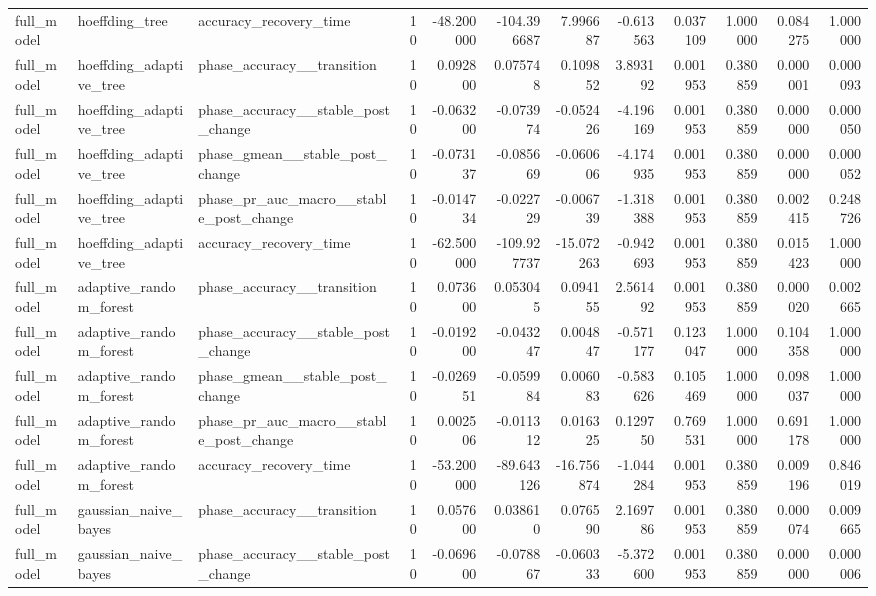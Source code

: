 \begin{tabular}{lllrrrrrrrrr}
full\_model & hoeffding\_tree & accuracy\_recovery\_time & 10 & -48.200000 & -104.396687 & 7.996687 & -0.613563 & 0.037109 & 1.000000 & 0.084275 & 1.000000 \\
full\_model & hoeffding\_adaptive\_tree & phase\_accuracy\_\_transition & 10 & 0.092800 & 0.075748 & 0.109852 & 3.893192 & 0.001953 & 0.380859 & 0.000001 & 0.000093 \\
full\_model & hoeffding\_adaptive\_tree & phase\_accuracy\_\_stable\_post\_change & 10 & -0.063200 & -0.073974 & -0.052426 & -4.196169 & 0.001953 & 0.380859 & 0.000000 & 0.000050 \\
full\_model & hoeffding\_adaptive\_tree & phase\_gmean\_\_stable\_post\_change & 10 & -0.073137 & -0.085669 & -0.060606 & -4.174935 & 0.001953 & 0.380859 & 0.000000 & 0.000052 \\
full\_model & hoeffding\_adaptive\_tree & phase\_pr\_auc\_macro\_\_stable\_post\_change & 10 & -0.014734 & -0.022729 & -0.006739 & -1.318388 & 0.001953 & 0.380859 & 0.002415 & 0.248726 \\
full\_model & hoeffding\_adaptive\_tree & accuracy\_recovery\_time & 10 & -62.500000 & -109.927737 & -15.072263 & -0.942693 & 0.001953 & 0.380859 & 0.015423 & 1.000000 \\
full\_model & adaptive\_random\_forest & phase\_accuracy\_\_transition & 10 & 0.073600 & 0.053045 & 0.094155 & 2.561492 & 0.001953 & 0.380859 & 0.000020 & 0.002665 \\
full\_model & adaptive\_random\_forest & phase\_accuracy\_\_stable\_post\_change & 10 & -0.019200 & -0.043247 & 0.004847 & -0.571177 & 0.123047 & 1.000000 & 0.104358 & 1.000000 \\
full\_model & adaptive\_random\_forest & phase\_gmean\_\_stable\_post\_change & 10 & -0.026951 & -0.059984 & 0.006083 & -0.583626 & 0.105469 & 1.000000 & 0.098037 & 1.000000 \\
full\_model & adaptive\_random\_forest & phase\_pr\_auc\_macro\_\_stable\_post\_change & 10 & 0.002506 & -0.011312 & 0.016325 & 0.129750 & 0.769531 & 1.000000 & 0.691178 & 1.000000 \\
full\_model & adaptive\_random\_forest & accuracy\_recovery\_time & 10 & -53.200000 & -89.643126 & -16.756874 & -1.044284 & 0.001953 & 0.380859 & 0.009196 & 0.846019 \\
full\_model & gaussian\_naive\_bayes & phase\_accuracy\_\_transition & 10 & 0.057600 & 0.038610 & 0.076590 & 2.169786 & 0.001953 & 0.380859 & 0.000074 & 0.009665 \\
full\_model & gaussian\_naive\_bayes & phase\_accuracy\_\_stable\_post\_change & 10 & -0.069600 & -0.078867 & -0.060333 & -5.372600 & 0.001953 & 0.380859 & 0.000000 & 0.000006 \\

\end{tabular}
